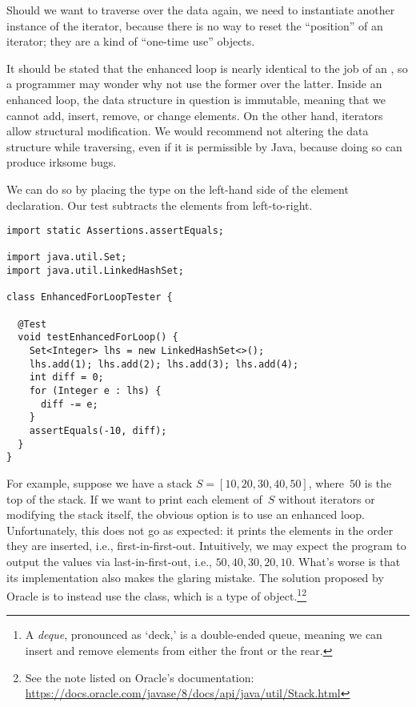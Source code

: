 Should we want to traverse over the data again, we need to instantiate another instance of the iterator, because there is no way to reset the ``position'' of an iterator; they are a kind of ``one-time use'' objects.

It should be stated that the enhanced  loop is nearly identical to the job of an , so a programmer may wonder why not use the former over the latter. 
Inside an enhanced  loop, the data structure in question is immutable, meaning that we cannot add, insert, remove, or change elements. 
On the other hand, iterators allow structural modification. 
We would recommend not altering the data structure while traversing, even if it is permissible by Java, because doing so can produce irksome bugs. 

 We can do so by placing the type on the left-hand side of the element declaration. 
Our test subtracts the elements from left-to-right.

\begin{lstlisting}[language=MyJava]
import static Assertions.assertEquals;

import java.util.Set;
import java.util.LinkedHashSet;

class EnhancedForLoopTester {

  @Test
  void testEnhancedForLoop() {
    Set<Integer> lhs = new LinkedHashSet<>();
    lhs.add(1); lhs.add(2); lhs.add(3); lhs.add(4);
    int diff = 0;
    for (Integer e : lhs) { 
      diff -= e; 
    }
    assertEquals(-10, diff);
  }
}
\end{lstlisting}

For example, suppose we have a stack $S=[10, 20, 30, 40, 50]$, where~$50$ is the top of the stack. 
If we want to print each element of~$S$ without iterators or modifying the stack itself, the obvious option is to use an enhanced  loop. 
Unfortunately, this does not go as expected: it prints the elements in the order they are inserted, i.e., first-in-first-out. 
Intuitively, we may expect the program to output the values via last-in-first-out, i.e., $50, 40, 30, 20, 10$. 
What's worse is that its  implementation also makes the glaring mistake. 
The solution proposed by Oracle is to instead use the  class, which is a type of  object.\footnote{A \emph{deque}, pronounced as `deck,' is a double-ended queue, meaning we can insert and remove elements from either the front or the rear.}\footnote{See the note listed on Oracle's  documentation: \url{https://docs.oracle.com/javase/8/docs/api/java/util/Stack.html}}

